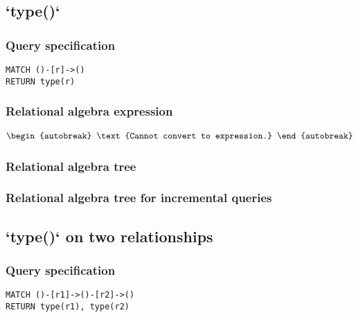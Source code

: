 
\subsection{`type()`}

\subsubsection*{Query specification}

\begin{lstlisting}
MATCH ()-[r]->()
RETURN type(r)
\end{lstlisting}

\subsubsection*{Relational algebra expression}

\begin{align*}
\begin{autobreak}
\text{Cannot convert to expression.}
\end{autobreak}
\end{align*}

\subsubsection*{Relational algebra tree}


\subsubsection*{Relational algebra tree for incremental queries}


\subsection{`type()` on two relationships}

\subsubsection*{Query specification}

\begin{lstlisting}
MATCH ()-[r1]->()-[r2]->()
RETURN type(r1), type(r2)
\end{lstlisting}

